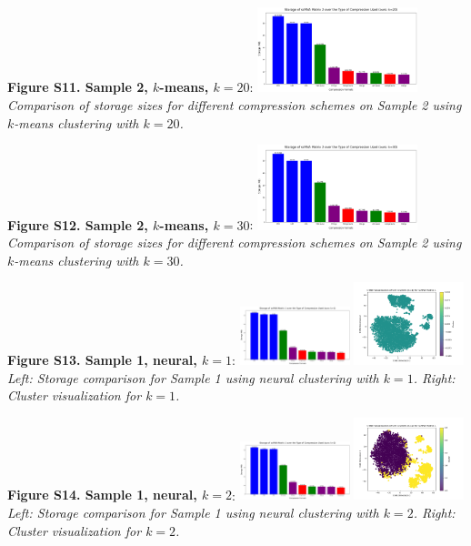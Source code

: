 \documentclass[unnumsec,webpdf,contemporary,large]{oup-authoring-template}
\begin{document}
\textbf{Figure S11. Sample 2, $k$-means, $k=20$}:
\newline
\includegraphics[width=0.35\textwidth]{compressed/kmeans/sample2/k20/storage_comparisons.png}\\
\textit{Comparison of storage sizes for different compression schemes on Sample 2 using $k$-means clustering with $k=20$.}

\textbf{Figure S12. Sample 2, $k$-means, $k=30$}:
\newline
\includegraphics[width=0.35\textwidth]{compressed/kmeans/sample2/k30/storage_comparisons.png}\\
\textit{Comparison of storage sizes for different compression schemes on Sample 2 using $k$-means clustering with $k=30$.}

\textbf{Figure S13. Sample 1, neural, $k=1$}:
\newline
\includegraphics[width=0.24\textwidth]{compressed/neural/sample1/k1/storage_comparisons.png}
\includegraphics[width=0.24\textwidth]{compressed/neural/sample1/k1/clusters.png}\\
\textit{Left: Storage comparison for Sample 1 using neural clustering with $k=1$. Right: Cluster visualization for $k=1$.}

\textbf{Figure S14. Sample 1, neural, $k=2$}:
\newline
\includegraphics[width=0.24\textwidth]{compressed/neural/sample1/k2/storage_comparisons.png}
\includegraphics[width=0.24\textwidth]{compressed/neural/sample1/k2/clusters.png}\\
\textit{Left: Storage comparison for Sample 1 using neural clustering with $k=2$. Right: Cluster visualization for $k=2$.}
\end{document}
